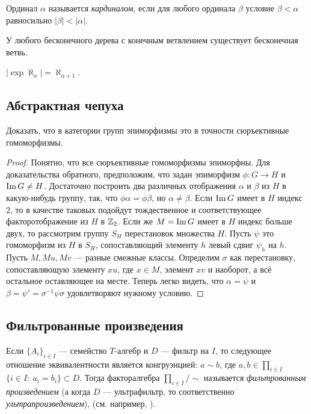 \documentclass[10pt,a4paper]{article}%
\begin{document}
Ординал $\alpha$ называется {\em кардиналом}, если
для любого ординала $\beta$ условие $\beta<\alpha$ равносильно
$|\beta|<|\alpha|$.

\begin{lemma}[Кёниг]
У любого бесконечного дерева с конечным ветвлением существует
бесконечная ветвь.
\end{lemma}

$|\exp\aleph_{\alpha}|=\aleph_{\alpha+1}$.

\subsection{Абстрактная чепуха}

\begin{theorem}
Доказать, что в категории групп эпиморфизмы это в точности
сюръективные гомоморфизмы.
\end{theorem}

\begin{proof} Понятно, что все сюръективные гомоморфизмы эпиморфны. Для
доказательства обратного, предположим, что задан эпиморфизм
$\phi:G\rightarrow H$ и $\operatorname{Im} G\ne H$. Достаточно построить два
различных отображения $\alpha$ и $\beta$ из $H$ в какую-нибудь
группу, так, что $\phi\alpha=\phi\beta$, но $\alpha\ne\beta$. Если
$\operatorname{Im} G$ имеет в $H$ индекс 2, то в качестве таковых подойдут
тождественное и соответствующее факторотображение из $H$ в
$\mathbb Z_2$. Если же $M=\operatorname{Im} G$ имеет в $H$ индекс больше двух, то
рассмотрим группу $S_H$ перестановок множества $H$. Пусть $\psi$
это гомоморфизм из $H$ в $S_H$, сопоставляющий элементу $h$ левый
сдвиг $\psi_h$ на $h$. Пусть $M,Mu,Mv$ --- разные смежные классы.
Определим $\sigma$ как перестановку, сопоставляющую элементу $xu$,
где $x\in M$, элемент $xv$ и наоборот, а всё остальное оставляющее
на месте. Теперь легко видеть, что $\alpha=\psi$ и
$\beta=\psi'=\sigma^{-1}\psi\sigma$ удовлетворяют нужному
условию.\end{proof}

\subsection{Фильтрованные произведения}

Если $\{A_i\}_{i\in I}$ --- семейство $T$-алгебр и $D$ --- фильтр
на $I$, то следующее отношение эквивалентности является
конгруэнцией: $a\sim b$, где $a,b\in\prod\limits_{i\in I}$ \ifif
$\{i\in I:~a_i=b_i\}\subset D$. Тогда факторалгебра
$\prod\limits_{i\in I}/\sim$ называется {\em
фильтрованным произведением} (а
когда $D$
--- ультрафильтр, то соответственно {\em ультрапроизведением}),
(см. например, \cite{Sk,Mal}).
\end{document}
